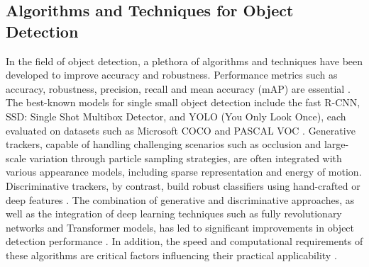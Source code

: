 \documentclass[12pt,oneside]{book} %
\begin{document}
\subsection{Algorithms and Techniques for Object Detection}
In the field of object detection, a plethora of algorithms and techniques have
been developed to improve accuracy and robustness. Performance metrics such as
accuracy, robustness, precision, recall and mean accuracy (mAP) are essential
\cite{SurveySmallObjectDetection}. The best-known models for single small
object detection include the fast R-CNN, SSD: Single Shot Multibox Detector,
and YOLO (You Only Look Once), each evaluated on datasets such as Microsoft
COCO and PASCAL VOC \cite{SurveySmallObjectDetection,
    SmallObjectDetectionPositonPrediction, SurveyModernODModels}. Generative
trackers, capable of handling challenging scenarios such as occlusion and
large-scale variation through particle sampling strategies, are often
integrated with various appearance models, including sparse representation and
energy of motion. Discriminative trackers, by contrast, build robust
classifiers using hand-crafted or deep features \cite{SurveyVisualOT}. The
combination of generative and discriminative approaches, as well as the
integration of deep learning techniques such as fully revolutionary networks
and Transformer models, has led to significant improvements in object detection
performance \cite{OverviewCorrelationAlgoOT, SuveyAdvancesSingleOTMethods,
    SurveyModernODModels}. In addition, the speed and computational requirements of
these algorithms are critical factors influencing their practical applicability
\cite{SuveyAdvancesSingleOTMethods, SurveyModernODModels,
    SurveyTransformersSingleOT}.
\end{document}
